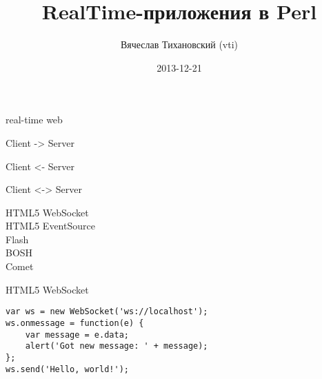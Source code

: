 \documentclass[14pt]{beamer}
\begin{document}
\title{RealTime-приложения в Perl}
\author{Вячеслав Тихановский (vti)}
\date{2013-12-21}

\lstset{commentstyle=\textit}
\lstset{basicstyle=\small,language=Perl}

\frame{\titlepage}

\begin{frame}
    \begin{center}
        real-time web
    \end{center}
\end{frame}

\begin{frame}
    \begin{center}
        Client -> Server

        Client <- Server
    \end{center}
\end{frame}

\begin{frame}
    \begin{center}
        Client <-> Server
    \end{center}
\end{frame}

\begin{frame}
    \begin{center}
        HTML5 WebSocket\\
        HTML5 EventSource\\
        Flash\\
        BOSH\\
        Comet
    \end{center}
\end{frame}

\begin{frame}
    \begin{center}
        HTML5 WebSocket
    \end{center}
\end{frame}

\begin{frame}[fragile]
    \begin{verbatim}
var ws = new WebSocket('ws://localhost');
ws.onmessage = function(e) {
    var message = e.data;
    alert('Got new message: ' + message);
};
ws.send('Hello, world!');
    \end{verbatim}
\end{frame}
\end{document}
